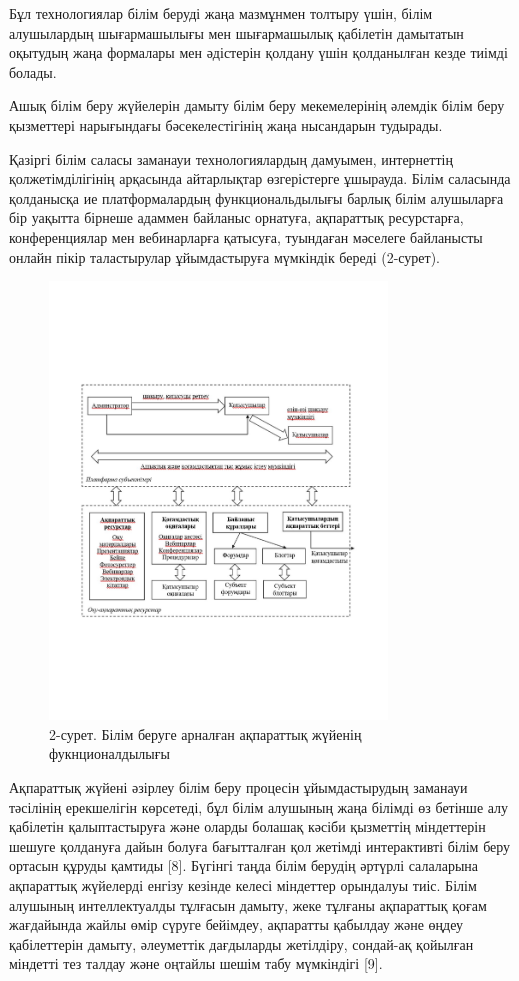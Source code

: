 Бұл технологиялар білім беруді жаңа мазмұнмен толтыру үшін, білім
алушылардың шығармашылығы мен шығармашылық қабілетін дамытатын оқытудың
жаңа формалары мен әдістерін қолдану үшін қолданылған кезде тиімді
болады.

Ашық білім беру жүйелерін дамыту білім беру мекемелерінің әлемдік білім
беру қызметтері нарығындағы бәсекелестігінің жаңа нысандарын тудырады.

Қазіргі білім саласы заманауи технологиялардың дамуымен, интернеттің
қолжетімділігінің арқасында айтарлықтар өзгерістерге ұшырауда. Білім
саласында қолданысқа ие платформалардың функциональдылығы барлық білім
алушыларға бір уақытта бірнеше адаммен байланыс орнатуға, ақпараттық
ресурстарға, конференциялар мен вебинарларға қатысуға, туындаған
мәселеге байланысты онлайн пікір таластырулар ұйымдастыруға мүмкіндік
береді (2-сурет).

\begin{figure}[H]
	\centering
	\includegraphics[width=0.8\textwidth]{media/ict/image100}
	\caption*{2-сурет. Білім беруге арналған ақпараттық жүйенің
фукнционалдылығы}
\end{figure}




Ақпараттық жүйені әзірлеу білім беру процесін ұйымдастырудың заманауи
тәсілінің ерекшелігін көрсетеді, бұл білім алушының жаңа білімді өз
бетінше алу қабілетін қалыптастыруға және оларды болашақ кәсіби
қызметтің міндеттерін шешуге қолдануға дайын болуға бағытталған қол
жетімді интерактивті білім беру ортасын құруды қамтиды {[}8{]}. Бүгінгі
таңда білім берудің әртүрлі салаларына ақпараттық жүйелерді енгізу
кезінде келесі міндеттер орындалуы тиіс. Білім алушының интеллектуалды
тұлғасын дамыту, жеке тұлғаны ақпараттық қоғам жағдайында жайлы өмір
сүруге бейімдеу, ақпаратты қабылдау және өңдеу қабілеттерін дамыту,
әлеуметтік дағдыларды жетілдіру, сондай-ақ қойылған міндетті тез талдау
және оңтайлы шешім табу мүмкіндігі {[}9{]}.

